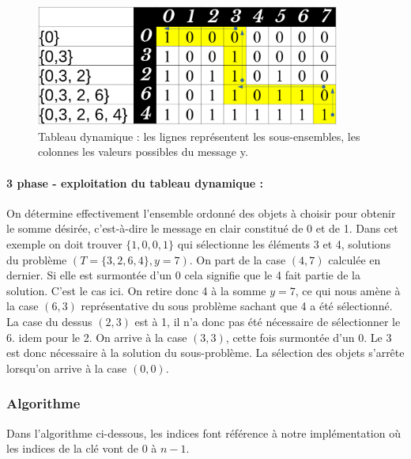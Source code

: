 \begin{figure}[htp]
  \centering
  \includegraphics[width=10cm]{images/dyn2}
  \caption{Tableau dynamique : les lignes représentent les sous-ensembles, les colonnes les valeurs possibles du message y.}
  \label{dyn2}
\end{figure}

\paragraph{3\ieme{} phase - exploitation du tableau dynamique :} On détermine effectivement l'ensemble ordonné des objets à choisir pour obtenir le somme
désirée, c'est-à-dire le message en clair constitué de 0 et de 1. Dans cet exemple on doit trouver  $\{1, 0, 0, 1\}$
qui sélectionne les éléments 3 et 4, solutions du problème $(T = \{3, 2, 6, 4\}, y = 7)$. On part de la case $(4,7)$ calculée en dernier.
Si elle est surmontée d'un 0 cela signifie que le 4 fait partie de la solution. C'est le cas ici. On retire donc 4 à la somme $y = 7$, ce qui nous amène
à la case $(6,3)$ représentative du sous problème sachant que 4 a été sélectionné. La case du dessus $(2,3)$ est à 1, il n'a donc pas été nécessaire de sélectionner le 6.
idem pour le 2. On arrive à la case $(3,3)$, cette fois surmontée d'un 0. Le 3 est donc nécessaire à la solution du sous-problème. 
La sélection des objets s'arrête lorsqu'on arrive à la case $(0,0)$.

\subsubsection{Algorithme}

Dans l'algorithme ci-dessous, les indices font référence à notre implémentation où les indices de la clé vont de $0$ à $n-1$.

